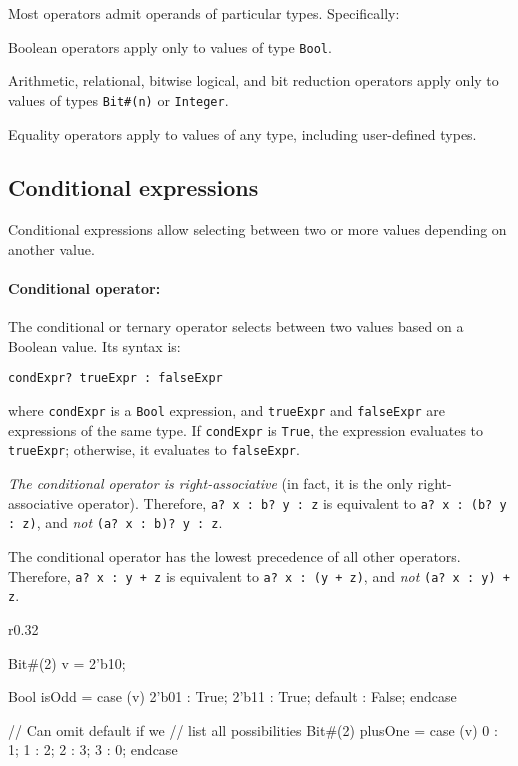 \smallskip

Most operators admit operands of particular types. Specifically:
\begin{compactitem}
\item Boolean operators apply only to values of type \texttt{Bool}.
\item Arithmetic, relational, bitwise logical, and bit reduction operators
  apply only to values of types \texttt{Bit\#(n)} or \texttt{Integer}.
\item Equality operators apply to values of any type, including user-defined types.
\end{compactitem}

\subsection{Conditional expressions}
\label{sec:condExprs}

Conditional expressions allow selecting between two or more values depending on another value.

\paragraph{Conditional operator:} The conditional or ternary operator selects between two values based on a Boolean value.
Its syntax is: 
\begin{center}
\verb|condExpr? trueExpr : falseExpr|
\end{center}
where \verb|condExpr| is a \verb|Bool| expression, and \verb|trueExpr| and \verb|falseExpr| are expressions of the same type.
If \verb|condExpr| is \verb|True|, the expression evaluates to \verb|trueExpr|; otherwise, it evaluates to \verb|falseExpr|.

\emph{The conditional operator is right-associative} (in fact, it is the only right-associative operator).
Therefore, \verb|a? x : b? y : z| is equivalent to
\verb|a? x : (b? y : z)|, and \emph{not} \verb|(a? x : b)? y : z|.

The conditional operator has the lowest precedence of all other operators.
Therefore, \verb|a? x : y + z| is equivalent to \verb|a? x : (y + z)|,
and \emph{not} \verb|(a? x : y) + z|.

\begin{wrapfigure}{r}{0.32\columnwidth}
\vspace{-1.5em}
\begin{mscode}
Bit#(2) v = 2'b10;

Bool isOdd = case (v)
  2'b01 : True;
  2'b11 : True;
  default : False;
endcase

// Can omit default if we
// list all possibilities
Bit#(2) plusOne = case (v)
  0 : 1;
  1 : 2;
  2 : 3;
  3 : 0;
endcase
\end{mscode}
\vspace{-2em}
\end{wrapfigure}

